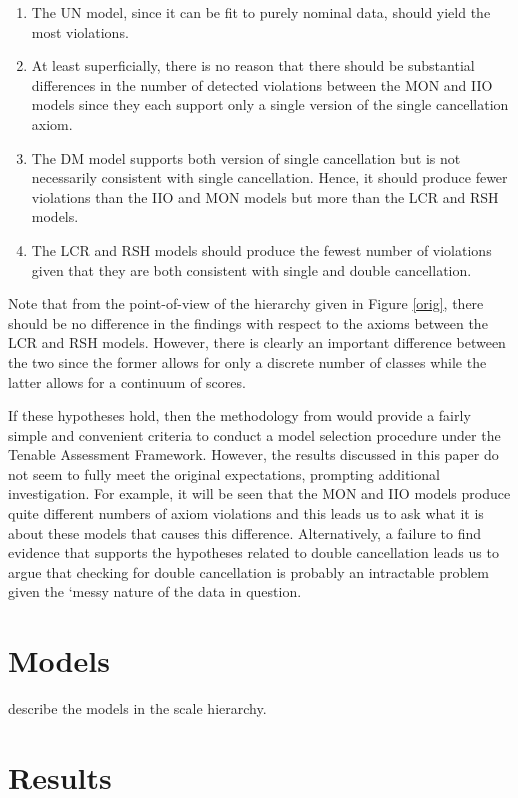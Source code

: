 \documentclass[12pt]{article}
\begin{document}
\begin{enumerate}
\item The UN model, since it can be fit to purely nominal data, should yield the most violations.
\item At least superficially, there is no reason that there should be substantial differences in the number of detected violations between the MON and IIO models since they each support only a single version of the single cancellation axiom.
\item The DM model supports both version of single cancellation but is not necessarily consistent with single cancellation. Hence, it should produce fewer violations than the IIO and MON models but more than the LCR and RSH models.
\item The LCR and RSH models should produce the fewest number of violations given that they are both consistent with single and double cancellation.
\end{enumerate}
Note that from the point-of-view of the hierarchy given in Figure \ref{orig}, there should be no difference in the findings with respect to the axioms between the LCR and RSH models. However, there is clearly an important difference between the two since the former allows for only a discrete number of classes while the latter allows for a continuum of scores. 

If these hypotheses hold, then the methodology from  would provide a fairly simple and convenient criteria to conduct a model selection procedure under the Tenable Assessment Framework. However, the results discussed in this paper do not seem to fully meet the original expectations, prompting additional investigation. For example, it will be seen that the MON and IIO models produce quite different numbers of axiom violations and this leads us to ask what it is about these models that causes this difference. Alternatively, a failure to find evidence that supports the hypotheses related to double cancellation leads us to argue that checking for double cancellation is probably an intractable problem given the `messy nature of the data in question.

\section{Models}
describe the models in the scale hierarchy. 

 
\section{Results}
\end{document}
